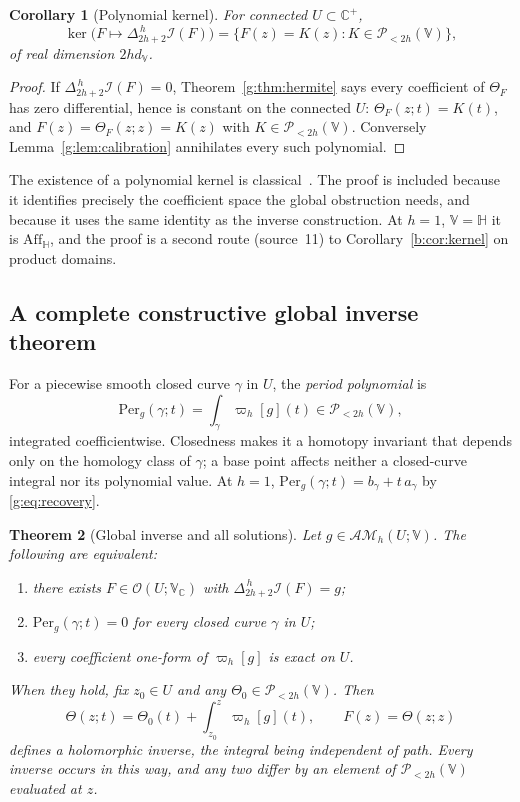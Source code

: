 \documentclass[11pt,a4paper]{article}
\numberwithin{equation}{section}
\newtheorem{theorem}{Theorem}[section]
\newtheorem{corollary}[theorem]{Corollary}
\theoremstyle{definition}
\theoremstyle{remark}
\theoremstyle{plain}
\newcommand{\HH}{\mathbb H}
\newcommand{\CC}{\mathbb C}
\newcommand{\Cplus}{\CC^{+}}
\newcommand{\I}{\mathcal I}
\newcommand{\AM}{\mathcal{AM}}
\newcommand{\Aff}{\mathrm{Aff}_{\HH}}
\newcommand{\Per}{\mathrm{Per}}
\newcommand{\lapH}{\Delta_{2h+2}^{\,h}}
\newcommand{\VV}{\mathbb V}                       %
\newcommand{\VC}{\mathbb V_{\CC}}                 %
\newcommand{\dV}{d_{\VV}}                         %
\newcommand{\PolH}{\mathscr P_{<2h}(\VV)}
\newcommand{\cur}{\varpi}                         %
\newcommand{\Herm}{\Theta}                        %
\begin{document}
\begin{corollary}[Polynomial kernel]
\label{g:cor:kernel}
For connected $U\subset\Cplus$,
\begin{equation}\label{g:eq:kernel}
 \ker\bigl(F\mapsto\lapH\I(F)\bigr)=\{F(z)=K(z):K\in\PolH\},
\end{equation}
of real dimension $2h\dV$.
\end{corollary}

\begin{proof}
If $\lapH\I(F)=0$, Theorem~\ref{g:thm:hermite} says every coefficient of
$\Herm_F$ has zero differential, hence is constant on the connected $U$:
$\Herm_F(z;t)=K(t)$, and $F(z)=\Herm_F(z;z)=K(z)$ with $K\in\PolH$. Conversely
Lemma~\ref{g:lem:calibration} annihilates every such polynomial.
\end{proof}

The existence of a polynomial kernel is classical~\cite{CPSS,DDG}. The proof
is included because it identifies precisely the coefficient space the global
obstruction needs, and because it uses the same identity as the inverse
construction. At $h=1$, $\VV=\HH$ it is $\Aff$, and the proof is a second route
(source~11) to Corollary~\ref{b:cor:kernel} on product domains.

\subsection{A complete constructive global inverse theorem}
\label{g:sub:inverse}

For a piecewise smooth closed curve $\gamma$ in $U$, the \emph{period
polynomial} is
\begin{equation}\label{g:eq:period}
 \Per_g(\gamma;t)=\int_\gamma\cur_h[g](t)\in\PolH,
\end{equation}
integrated coefficientwise. Closedness makes it a homotopy invariant that
depends only on the homology class of $\gamma$; a base point affects neither
a closed-curve integral nor its polynomial value. At $h=1$,
$\Per_g(\gamma;t)=b_\gamma+t\,a_\gamma$ by \eqref{g:eq:recovery}.

\begin{theorem}[Global inverse and all solutions]
\label{g:thm:inverse}
Let $g\in\AM_h(U;\VV)$. The following are equivalent:
\begin{enumerate}[label=\textup{(\alph*)}]
\item there exists $F\in\mathcal O(U;\VC)$ with $\lapH\I(F)=g$;
\item $\Per_g(\gamma;t)=0$ for every closed curve $\gamma$ in $U$;
\item every coefficient one-form of $\cur_h[g]$ is exact on $U$.
\end{enumerate}
When they hold, fix $z_0\in U$ and any $\Herm_0\in\PolH$. Then
\begin{equation}\label{g:eq:inverse-formula}
 \Herm(z;t)=\Herm_0(t)+\int_{z_0}^{z}\cur_h[g](t),\qquad F(z)=\Herm(z;z)
\end{equation}
defines a holomorphic inverse, the integral being independent of path. Every
inverse occurs in this way, and any two differ by an element of $\PolH$
evaluated at $z$.
\end{theorem}
\end{document}
